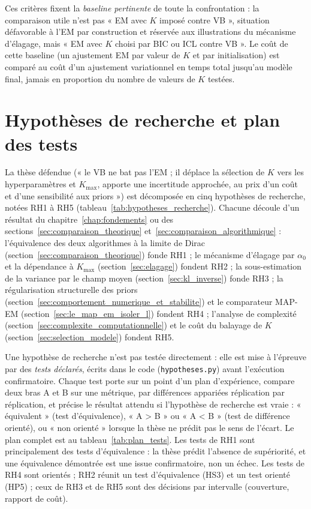 Ces critères fixent la \emph{baseline pertinente} de toute la confrontation : la comparaison utile n'est pas « EM avec $K$ imposé contre VB », situation défavorable à l'EM par construction et réservée aux illustrations du mécanisme d'élagage, mais « EM avec $K$ choisi par BIC ou ICL contre VB ». Le coût de cette baseline (un ajustement EM par valeur de $K$ et par initialisation) est comparé au coût d'un ajustement variationnel en temps total jusqu'au modèle final, jamais en proportion du nombre de valeurs de $K$ testées.

\section{Hypothèses de recherche et plan des tests}\label{sec:hypotheses}
La thèse défendue (« le VB ne bat pas l'EM ; il déplace la sélection de $K$ vers les hyperparamètres et $K_{\max}$, apporte une incertitude approchée, au prix d'un coût et d'une sensibilité aux priors ») est décomposée en cinq hypothèses de recherche, notées RH1 à RH5 (tableau~\ref{tab:hypotheses_recherche}). Chacune découle d'un résultat du chapitre~\ref{chap:fondements} ou des sections~\ref{sec:comparaison_theorique} et~\ref{sec:comparaison_algorithmique} : l'équivalence des deux algorithmes à la limite de Dirac (section~\ref{sec:comparaison_theorique}) fonde RH1 ; le mécanisme d'élagage par $\alpha_0$ et la dépendance à $K_{\max}$ (section~\ref{sec:elagage}) fondent RH2 ; la sous-estimation de la variance par le champ moyen (section~\ref{sec:kl_inverse}) fonde RH3 ; la régularisation structurelle des priors (section~\ref{sec:comportement_numerique_et_stabilite}) et le comparateur MAP-EM (section~\ref{sec:le_map_em_isoler_l}) fondent RH4 ; l'analyse de complexité (section~\ref{sec:complexite_computationnelle}) et le coût du balayage de $K$ (section~\ref{sec:selection_modele}) fondent RH5.


Une hypothèse de recherche n'est pas testée directement : elle est mise à l'épreuve par des \emph{tests déclarés}, écrits dans le code (\texttt{hypotheses.py}) avant l'exécution confirmatoire. Chaque test porte sur un point d'un plan d'expérience, compare deux bras A et B sur une métrique, par différences appariées réplication par réplication, et précise le résultat attendu si l'hypothèse de recherche est vraie : « équivalent » (test d'équivalence), « A > B » ou « A < B » (test de différence orienté), ou « non orienté » lorsque la thèse ne prédit pas le sens de l'écart. Le plan complet est au tableau~\ref{tab:plan_tests}. Les tests de RH1 sont principalement des tests d'équivalence : la thèse prédit l'absence de supériorité, et une équivalence démontrée est une issue confirmatoire, non un échec. Les tests de RH4 sont orientés ; RH2 réunit un test d'équivalence (HS3) et un test orienté (HP5) ; ceux de RH3 et de RH5 sont des décisions par intervalle (couverture, rapport de coût).

